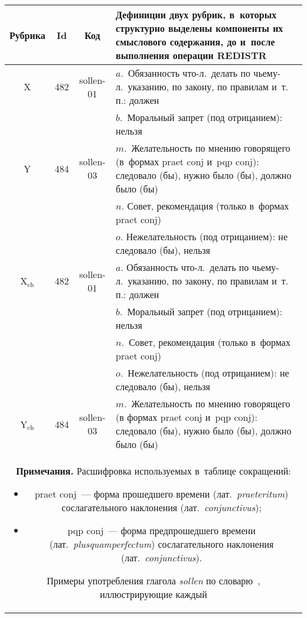 \begin{multicols}{2}
\begin{table*}\small %
\begin{center}
\vspace*{2ex}

\begin{tabular}{|c|c|c|p{120mm}|}
\hline
Рубрика&Id&Код&Дефиниции двух рубрик, в~которых структурно выделены 
компоненты их смыслового содержания, до и~после выполнения операции 
\mbox{REDISTR}\\
\hline
X&482&sollen-01&$a$.~Обязанность что-л.\ делать по чьему-л.\ указанию, по закону, по 
правилам и~т.\,п.: должен\\
&&&$b$.~Моральный запрет (под отрицанием): нельзя\\
\hline
Y&484&sollen-03&$m$.~Желательность по мнению говорящего (в~формах praet conj 
и~pqp conj): следовало (бы), нужно было (бы), должно было (бы)\\
&&&$n$. Совет, рекомендация (только в~формах praet conj)\\
&&&$o$. Нежелательность (под отрицанием): не следовало (бы), нельзя\\
\hline
X$_{\mathrm{ch}}$&482&sollen-01&$a$. Обязанность что-л.\ делать по чьему-л.\ 
указанию, по закону, по правилам и~т.\,п.: должен\\
&&&$b$.~Моральный запрет (под отрицанием): нельзя\\
&&&$n$.~Совет, рекомендация (только в~формах praet conj)\\
&&&$o$.~Нежелательность (под отрицанием): не следовало (бы), нельзя\\
\hline
Y$_{\mathrm{ch}}$&484&sollen-03&$m$.~Желательность по мнению говорящего (в 
формах praet conj и~pqp conj): следовало (бы), нужно было (бы), должно было (бы)\\
\hline
\multicolumn{4}{p{162.7mm}}{\footnotesize\hspace*{3mm}\textbf{Примечания.}
Расшифровка используемых в~таблице сокращений:
\begin{itemize}
\addtolength{\itemsep}{-4pt}
\item praet conj~--- форма прошедшего времени (лат.\ \textit{praeteritum}) сослагательного 
наклонения (лат.\ \textit{conjunctivus});
\item pqp conj~--- форма предпрошедшего времени (лат.\ \textit{plusquamperfectum}) 
сослагательного наклонения (лат.\ \textit{conjunctivus}).
\end{itemize}
Примеры употребления глагола \textit{sollen} по словарю~\cite{17-gon}, иллюстрирующие каждый 
}
\end{tabular}
\end{center}
\end{table*}
\end{multicols}
